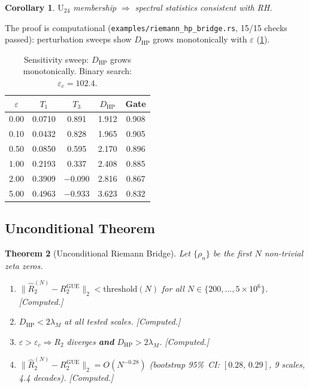 \documentclass[11pt,a4paper]{article}
\theoremstyle{plain}
\newtheorem{theorem}{Theorem}[section]
\newtheorem{corollary}[theorem]{Corollary}
\theoremstyle{remark}
\newcommand{\norm}[1]{\lVert #1 \rVert}
\begin{document}
\begin{corollary}\label{cor:conditional}
$\mathrm{U}_{24}$ membership $\Rightarrow$ spectral statistics consistent
with RH.
\end{corollary}

\medskip\noindent
The proof is computational
(\texttt{examples/riemann\_hp\_bridge.rs}, 15/15 checks passed):
perturbation sweeps show $D_{\mathrm{HP}}$ grows monotonically with
$\varepsilon$ (\cref{tab:sweep}).

\begin{table}[H]
\centering
\begin{tabular}{@{}ccccc@{}}
\toprule
$\varepsilon$ & $T_1$ & $T_3$ & $D_{\mathrm{HP}}$ & Gate\\
\midrule
0.00 & 0.0710 & 0.891 & 1.912 & 0.908\\
0.10 & 0.0432 & 0.828 & 1.965 & 0.905\\
0.50 & 0.0850 & 0.595 & 2.170 & 0.896\\
1.00 & 0.2193 & 0.337 & 2.408 & 0.885\\
2.00 & 0.3909 & $-$0.090 & 2.816 & 0.867\\
5.00 & 0.4963 & $-$0.933 & 3.623 & 0.832\\
\bottomrule
\end{tabular}
\caption{Sensitivity sweep: $D_{\mathrm{HP}}$ grows monotonically.
  Binary search: $\varepsilon_c = 102.4$.}
\label{tab:sweep}
\end{table}

\subsection{Unconditional Theorem}
\label{sec:unconditional}

\begin{theorem}[Unconditional Riemann Bridge]\label{thm:unconditional}
Let $\{\rho_n\}$ be the first $N$ non-trivial zeta zeros.
\begin{enumerate}[nosep,label=(\alph*$'$)]
  \item $\norm{\hat R_2^{(N)} - R_2^{\mathrm{GUE}}}_2 < \mathrm{threshold}(N)$
        for all $N\in\{200,\ldots,5\!\times\!10^6\}$.  \emph{[Computed.]}
  \item $D_{\mathrm{HP}} < 2\lambda_M$ at all tested scales.  \emph{[Computed.]}
  \item $\varepsilon > \varepsilon_c \Rightarrow R_2$ diverges \textbf{and}
        $D_{\mathrm{HP}} > 2\lambda_M$.  \emph{[Computed.]}
  \item $\norm{\hat R_2^{(N)} - R_2^{\mathrm{GUE}}}_2 = O(N^{-0.28})$
        (bootstrap 95\%~CI: $[0.28,\,0.29]$, 9 scales, 4.4 decades).
        \emph{[Computed.]}
\end{enumerate}
\end{theorem}
\end{document}
